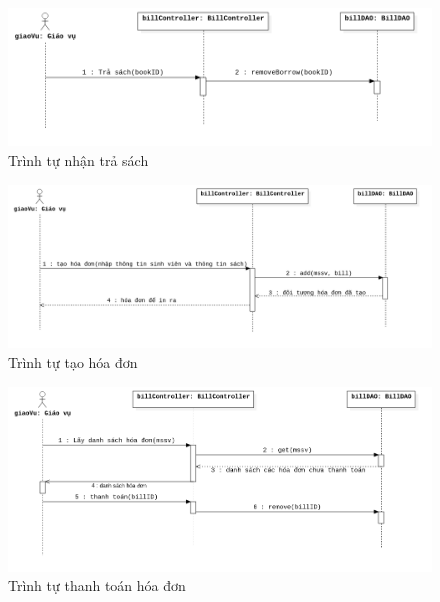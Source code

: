\documentclass[../report.tex]{subfiles}
\begin{document}
\begin{figure}[H]
\centering
\includegraphics[width=\textwidth]{figures/nhantrasachseq.png}
\caption{Trình tự nhận trả sách}
\end{figure}

\begin{figure}[H]
\centering
\includegraphics[width=\textwidth]{figures/taohoadonseq.png}
\caption{Trình tự tạo hóa đơn}
\end{figure}

\begin{figure}[H]
\centering
\includegraphics[width=\textwidth]{figures/thanhtoanseq.png}
\caption{Trình tự thanh toán hóa đơn}
\end{figure}
\end{document}
